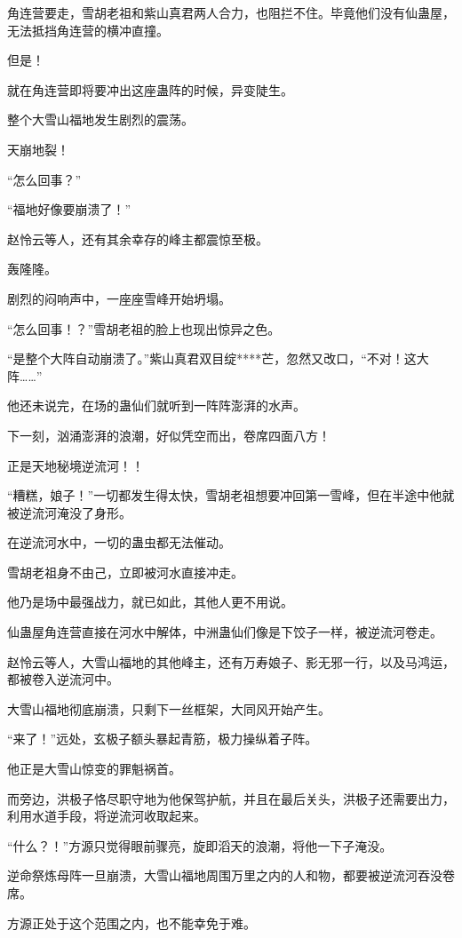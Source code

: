 \begin{this_body}
角连营要走，雪胡老祖和紫山真君两人合力，也阻拦不住。毕竟他们没有仙蛊屋，无法抵挡角连营的横冲直撞。

但是！

就在角连营即将要冲出这座蛊阵的时候，异变陡生。

整个大雪山福地发生剧烈的震荡。

天崩地裂！

“怎么回事？”

“福地好像要崩溃了！”

赵怜云等人，还有其余幸存的峰主都震惊至极。

轰隆隆。

剧烈的闷响声中，一座座雪峰开始坍塌。

“怎么回事！？”雪胡老祖的脸上也现出惊异之色。

“是整个大阵自动崩溃了。”紫山真君双目绽****芒，忽然又改口，“不对！这大阵……”

他还未说完，在场的蛊仙们就听到一阵阵澎湃的水声。

下一刻，汹涌澎湃的浪潮，好似凭空而出，卷席四面八方！

正是天地秘境逆流河！！

“糟糕，娘子！”一切都发生得太快，雪胡老祖想要冲回第一雪峰，但在半途中他就被逆流河淹没了身形。

在逆流河水中，一切的蛊虫都无法催动。

雪胡老祖身不由己，立即被河水直接冲走。

他乃是场中最强战力，就已如此，其他人更不用说。

仙蛊屋角连营直接在河水中解体，中洲蛊仙们像是下饺子一样，被逆流河卷走。

赵怜云等人，大雪山福地的其他峰主，还有万寿娘子、影无邪一行，以及马鸿运，都被卷入逆流河中。

大雪山福地彻底崩溃，只剩下一丝框架，大同风开始产生。

“来了！”远处，玄极子额头暴起青筋，极力操纵着子阵。

他正是大雪山惊变的罪魁祸首。

而旁边，洪极子恪尽职守地为他保驾护航，并且在最后关头，洪极子还需要出力，利用水道手段，将逆流河收取起来。

“什么？！”方源只觉得眼前骤亮，旋即滔天的浪潮，将他一下子淹没。

逆命祭炼母阵一旦崩溃，大雪山福地周围万里之内的人和物，都要被逆流河吞没卷席。

方源正处于这个范围之内，也不能幸免于难。


\end{this_body}
